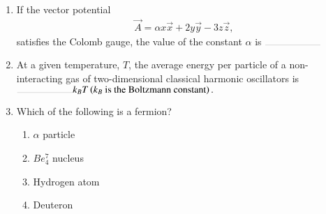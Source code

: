 \documentclass[journal,12pt,onecolumn]{IEEEtran}
\theoremstyle{remark}
\begin{document}
\begin{enumerate}
\item If the vector potential
\begin{align*}
\vec{A} = \alpha x\vec{x} + 2y\vec{y} - 3z\vec{z},
\end{align*}
satisfies the Colomb gauge, the value of the constant $\alpha$ is $\rule{2cm}{0.1pt}$

\item At a given temperature, $T$, the average energy per particle of a non-interacting gas of two-dimensional classical harmonic oscillators is $\rule{2cm}{0.1pt} k_{B}T\brak{k_B \text{ is the Boltzmann constant}}.$

\item Which of the following is a fermion?
\begin{enumerate}
\item $\alpha$ particle
\item $Be_{4}^{7}$ nucleus
\item Hydrogen atom
\item Deuteron
\end{enumerate}


\end{enumerate}
\end{document}
